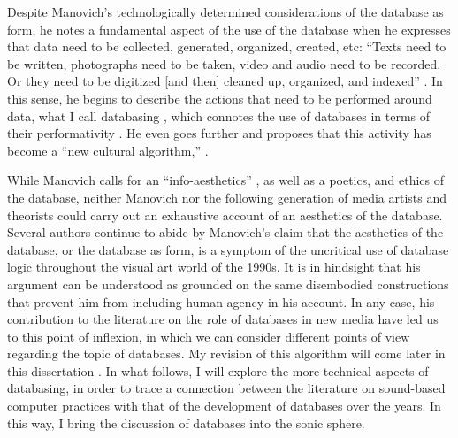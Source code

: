 Despite Manovich's technologically determined considerations of the database as form, he notes a fundamental aspect of the use of the database when he expresses that data need to be collected, generated, organized, created, etc: ``Texts need to be written, photographs need to be taken, video and audio need to be recorded. Or they need to be digitized [and then] cleaned up, organized, and indexed'' \parencite[224]{Man01:The}. In this sense, he begins to describe the actions that need to be performed around data, what I call databasing , which connotes the use of databases in terms of their performativity . He even goes further and proposes that this activity has become a ``new cultural algorithm,'' \parencite[225]{Man01:The} .


While Manovich calls for an ``info-aesthetics'' \parencite[217]{Man01:The}, as well as a poetics, and ethics of the database, neither Manovich nor the following generation of media artists and theorists could carry out an exhaustive account of an aesthetics of the database. Several authors continue to abide by Manovich's claim that the aesthetics of the database, or the database as form, is a symptom of the uncritical use of database logic throughout the visual art world of the 1990s. It is in hindsight that his argument can be understood as grounded on the same disembodied constructions that prevent him from including human agency in his account. In any case, his contribution to the literature on the role of databases in new media have led us to this point of inflexion, in which we can consider different points of view regarding the topic of databases. My revision of this algorithm will come later in this dissertation . In what follows, I will explore the more technical aspects of databasing, in order to trace a connection between the literature on sound-based computer practices with that of the development of databases over the years. In this way, I bring the discussion of databases into the sonic sphere.
